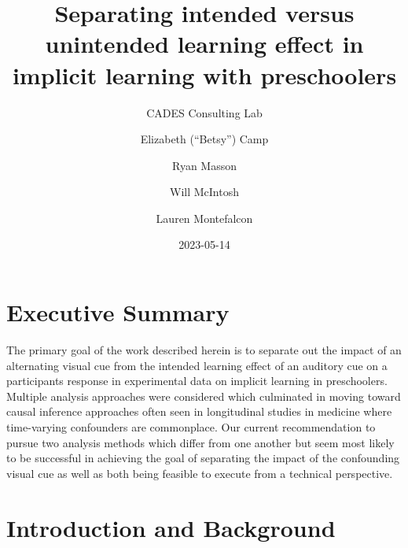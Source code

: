 \documentclass[
  letterpaper,
]{report}
\title{Separating intended versus unintended learning effect in implicit
learning with preschoolers}
\subtitle{CADES Consulting Lab}
\author{Elizabeth (``Betsy'') Camp \and Ryan Masson \and Will
McIntosh \and Lauren Montefalcon}
\date{2023-05-14}
\renewcommand*\contentsname{Table of contents}
\newcommand\contentsname{Table of contents}
\begin{document}
\maketitle
\ifdefined\Shaded\renewenvironment{Shaded}{\begin{tcolorbox}[enhanced, interior hidden, frame hidden, boxrule=0pt, sharp corners, breakable, borderline west={3pt}{0pt}{shadecolor}]}{\end{tcolorbox}}\fi

\renewcommand*\contentsname{Table of contents}
{
\hypersetup{linkcolor=}
\setcounter{tocdepth}{2}
\tableofcontents
}
\newpage{}

\hypertarget{executive-summary}{%
\section{Executive Summary}\label{executive-summary}}

The primary goal of the work described herein is to separate out the
impact of an alternating visual cue from the intended learning effect of
an auditory cue on a participants response in experimental data on
implicit learning in preschoolers. Multiple analysis approaches were
considered which culminated in moving toward causal inference approaches
often seen in longitudinal studies in medicine where time-varying
confounders are commonplace. Our current recommendation to pursue two
analysis methods which differ from one another but seem most likely to
be successful in achieving the goal of separating the impact of the
confounding visual cue as well as both being feasible to execute from a
technical perspective.

\hypertarget{introduction-and-background}{%
\section{Introduction and
Background}\label{introduction-and-background}}
\end{document}
